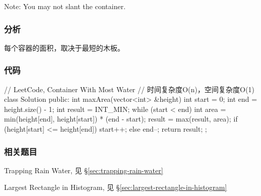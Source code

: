 Note: You may not slant the container.


\subsubsection{分析}
每个容器的面积，取决于最短的木板。


\subsubsection{代码}
\begin{Code}
	// LeetCode, Container With Most Water
	// 时间复杂度O(n)，空间复杂度O(1)
	class Solution {
		public:
		int maxArea(vector<int> &height) {
			int start = 0;
			int end = height.size() - 1;
			int result = INT_MIN;
			while (start < end) {
				int area = min(height[end], height[start]) * (end - start);
				result = max(result, area);
				if (height[start] <= height[end]) {
					start++;
				} else {
				end--;
			}
		}
		return result;
	}
};
\end{Code}


\subsubsection{相关题目}
\begindot
\item Trapping Rain Water, 见 \S \ref{sec:trapping-rain-water}
\item Largest Rectangle in Histogram, 见 \S \ref{sec:largest-rectangle-in-histogram}
\myenddot
